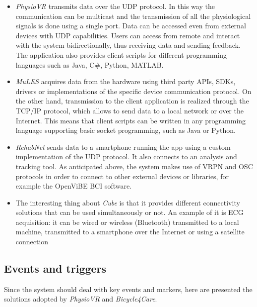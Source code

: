 \documentclass[binding=0.6cm,LaM]{sapthesis}
\begin{document}
\begin{itemize}

\item \textit{PhysioVR} transmits data over the UDP protocol. In this way the communication can be multicast and the transmission of all the physiological signals is done using a single port. Data can be accessed even from external devices with UDP capabilities. Users can access from remote and interact with the system bidirectionally, thus receiving data and sending feedback. The application also provides client scripts for different programming languages such as Java, C\#, Python, MATLAB.

\item \textit{MuLES} acquires data from the hardware using third party APIs, SDKs, drivers or implementations of the specific device communication protocol. On the other hand, transmission to the client application is realized through the TCP/IP protocol, which allows to send data to a local network or over the Internet.
This means that client scripts can be written in any programming language supporting basic socket programming, such as Java or Python.

\item \textit{RehabNet} sends data to a smartphone running the app using a custom implementation of the UDP protocol. It also connects to an analysis and tracking tool. As anticipated above, the system makes use of VRPN and OSC protocols in order to connect to other external devices or libraries, for example the OpenViBE BCI software.

\item The interesting thing about \textit{Cube} is that it provides different connectivity solutions that can be used simultaneously or not. An example of it is ECG acquisition: it can be wired or wireless (Bluetooth) transmitted to a local machine, transmitted to a smartphone over the Internet or using a satellite connection

\end{itemize}

\subsection{Events and triggers}
Since the system should deal with key events and markers, here are presented the solutions adopted by \textit{PhysioVR} and \textit{Bicycle4Care}.
\end{document}
